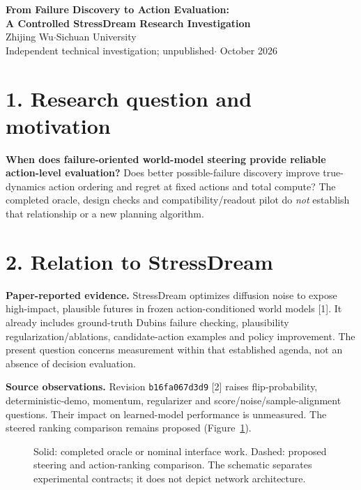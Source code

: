 \documentclass[letterpaper,10pt]{article}
\begin{document}
\begin{center}
{\fontsize{16.5}{19}\selectfont\bfseries From Failure Discovery to Action Evaluation:\\
A Controlled StressDream Research Investigation}\\[5pt]
Zhijing Wu\quad$\cdot$\quad Sichuan University\\[1pt]
Independent technical investigation; unpublished\quad$\cdot$ October 2026
\end{center}
\vspace{-5pt}

\section*{1. Research question and motivation}
\textbf{When does failure-oriented world-model steering provide reliable action-level evaluation?}
Does better possible-failure discovery improve true-dynamics action ordering and regret at fixed actions and total compute? The completed oracle, design checks and compatibility/readout pilot do \emph{not} establish that relationship or a new planning algorithm.

\section*{2. Relation to StressDream}
\textbf{Paper-reported evidence.} StressDream optimizes diffusion noise to expose high-impact, plausible futures in frozen action-conditioned world models [1]. It already includes ground-truth Dubins failure checking, plausibility regularization/ablations, candidate-action examples and policy improvement. The present question concerns measurement within that established agenda, not an absence of decision evaluation.

\textbf{Source observations.} Revision \texttt{b16fa067d3d9} [2] raises flip-probability, deterministic-demo, momentum, regularizer and score/noise/sample-alignment questions. Their impact on learned-model performance is unmeasured. The steered ranking comparison remains proposed (Figure~\ref{fig:pipeline}).

\begin{figure}[h!]
\centering
\resizebox{\linewidth}{!}{}
\caption{Solid: completed oracle or nominal interface work. Dashed: proposed steering and action-ranking comparison. The schematic separates experimental contracts; it does not depict network architecture.}
\label{fig:pipeline}
\end{figure}
\end{document}
